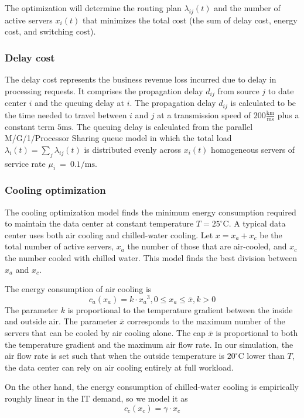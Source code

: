 \documentclass{acm_proc_article-sp}
\begin{document}
The optimization will determine the routing plan $\lambda_{ij}(t)$ and the number of active servers $x_i(t)$ that minimizes the total cost (the sum of delay cost, energy cost, and switching cost).

\subsubsection{Delay cost}
The delay cost represents the business revenue loss incurred due to delay in processing requests. It comprises the propagation delay $d_{ij}$ from source $j$ to date center $i$ and the queuing delay at $i$.
The propagation delay $d_{ij}$ is calculated to be the time needed to travel between $i$ and $j$ at a transmission speed of $200 \frac{\mathrm{km}}{\mathrm{ms}}$ plus a constant term $5 \mathrm{ms}$. The queuing delay is calculated from the parallel M/G/1/Processor Sharing queue model in which the total load $\lambda_i(t)=\sum_j \lambda_{ij}(t)$ is distributed evenly across $x_i(t)$ homogeneous servers of service rate \mbox{$\mu_i$ = $0.1 / \mathrm{ms}$}.

\subsubsection{Cooling optimization}
The cooling optimization model finds the minimum energy consumption required to maintain the data center at constant temperature $T = 25^{\circ}\textrm{C}$. A typical data center uses both air cooling and chilled-water cooling. Let $x = x_a + x_c$ be the total number of active servers, $x_a$ the number of those that are air-cooled, and $x_c$ the number cooled with chilled water. This model finds the best division between $x_a$ and $x_c$.

The energy consumption of air cooling is
\begin{equation}
c_a(x_a) = k \cdot {x_a}^3, 0 \leq x_a \leq \bar{x}, k > 0
\end{equation}
The parameter $k$ is proportional to the temperature gradient between the inside and outside air. The parameter $\bar{x}$ corresponds to the maximum number of the servers that can be cooled by air cooling alone. The cap $\bar{x}$ is proportional to both the temperature gradient and the maximum air flow rate. In our simulation, the air flow rate is set such that when the outside temperature is $20^{\circ}\mathrm{C}$ lower than $T$, the data center can rely on air cooling entirely at full workload.

On the other hand, the energy consumption of chilled-water cooling is empirically roughly linear in the IT demand, so we model it as
\begin{equation}
c_c(x_c) = \gamma \cdot x_c
\end{equation}
\end{document}
